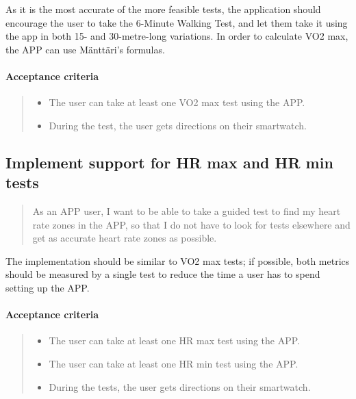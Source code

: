 As it is the most accurate of the more feasible tests, the application should encourage the user to take the 6-Minute Walking Test, and let them take it using the app in both 15- and 30-metre-long variations.
In order to calculate VO2 max, the APP can use Mänttäri's formulas.

\paragraph*{Acceptance criteria}
\begin{quote}
\begin{itemize}
    \item The user can take at least one VO2 max test using the APP.
    \item During the test, the user gets directions on their smartwatch.
\end{itemize}
\end{quote}

\subsection{Implement support for HR max and HR min tests}\label{US:fit-HR}
\begin{quote}
As an APP user, I want to be able to take a guided test to find my heart rate zones in the APP, so that I do not have to look for tests elsewhere and get as accurate heart rate zones as possible.
\end{quote}

The implementation should be similar to VO2 max tests; if possible, both metrics should be measured by a single test to reduce the time a user has to spend setting up the APP.

\paragraph*{Acceptance criteria}
\begin{quote}
\begin{itemize}
    \item The user can take at least one HR max test using the APP.
    \item The user can take at least one HR min test using the APP.
    \item During the tests, the user gets directions on their smartwatch.
\end{itemize}
\end{quote}


